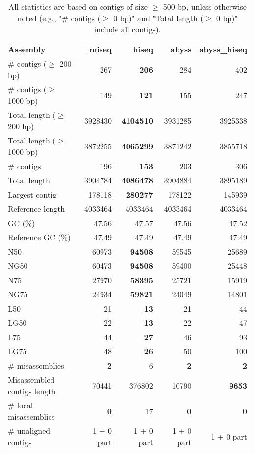 \documentclass[12pt,a4paper]{article}
\begin{document}
\begin{table}[ht]
\begin{center}
\caption{All statistics are based on contigs of size $\geq$ 500 bp, unless otherwise noted (e.g., "\# contigs ($\geq$ 0 bp)" and "Total length ($\geq$ 0 bp)" include all contigs).}
\begin{tabular}{|l*{4}{|r}|}
\hline
Assembly & miseq & hiseq & abyss & abyss\_hiseq \\ \hline
\# contigs ($\geq$ 200 bp) & 267 & {\bf 206} & 284 & 402 \\ \hline
\# contigs ($\geq$ 1000 bp) & 149 & {\bf 121} & 155 & 247 \\ \hline
Total length ($\geq$ 200 bp) & 3928430 & {\bf 4104510} & 3931285 & 3925338 \\ \hline
Total length ($\geq$ 1000 bp) & 3872255 & {\bf 4065299} & 3871242 & 3855718 \\ \hline
\# contigs & 196 & {\bf 153} & 203 & 306 \\ \hline
Total length & 3904784 & {\bf 4086478} & 3904884 & 3895189 \\ \hline
Largest contig & 178118 & {\bf 280277} & 178122 & 145939 \\ \hline
Reference length & 4033464 & 4033464 & 4033464 & 4033464 \\ \hline
GC (\%) & 47.56 & 47.57 & 47.56 & 47.52 \\ \hline
Reference GC (\%) & 47.49 & 47.49 & 47.49 & 47.49 \\ \hline
N50 & 60973 & {\bf 94508} & 59545 & 25689 \\ \hline
NG50 & 60473 & {\bf 94508} & 59400 & 25448 \\ \hline
N75 & 27970 & {\bf 58395} & 25721 & 15919 \\ \hline
NG75 & 24934 & {\bf 59821} & 24049 & 14801 \\ \hline
L50 & 21 & {\bf 13} & 21 & 44 \\ \hline
LG50 & 22 & {\bf 13} & 22 & 47 \\ \hline
L75 & 44 & {\bf 27} & 46 & 93 \\ \hline
LG75 & 48 & {\bf 26} & 50 & 100 \\ \hline
\# misassemblies & {\bf 2} & 6 & {\bf 2} & {\bf 2} \\ \hline
Misassembled contigs length & 70441 & 376802 & 10790 & {\bf 9653} \\ \hline
\# local misassemblies & {\bf 0} & 17 & {\bf 0} & {\bf 0} \\ \hline
\# unaligned contigs & 1 + 0 part & 1 + 0 part & 1 + 0 part & 1 + 0 part \\ \hline

\end{tabular}
\end{center}
\end{table}
\end{document}
